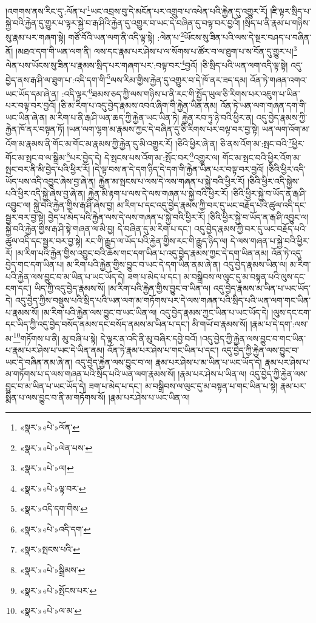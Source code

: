 །འགགས་ནས་རིང་དུ་:ལོན་པ་\footnote{«སྣར་»«པེ་»ལོན་}ཡང་འབྲས་བུ་དེ་མངོན་པར་འགྲུབ་པ་འཕེན་པའི་རྐྱེན་དུ་འགྱུར་རོ། །ཇི་ལྟར་སྲིད་པ་སྐྱེ་བའི་རྐྱེན་དུ་གྱུར་པ་ལྟར་སྐྱེ་བ་རྒ་ཤིའི་རྐྱེན་དུ་འགྱུར་བ་ཡང་དེ་བཞིན་དུ་བལྟ་བར་བྱའོ། །སྲིད་པ་ནི་རྣམ་པ་གཉིས་སུ་རྣམ་པར་གཞག་སྟེ། གཙོ་བོའི་ཡན་ལག་ནི་འདི་ལྟ་སྟེ། :ལེན་པ་\footnote{«སྣར་»«པེ་»ལེན་པས་}ཡོངས་སུ་ཟིན་པའི་ལས་དེ་སྔར་བཤད་པ་བཞིན་ནོ། །མཐའ་དག་གི་ཡན་ལག་ནི། ལས་དང་རྣམ་པར་ཤེས་པ་ལ་སོགས་པ་ཚོར་བ་ལ་ཐུག་པ་ས་བོན་དུ་གྱུར་པ།\footnote{«སྣར་»«པེ་»ལ།} ལེན་པས་ཡོངས་སུ་ཟིན་པ་རྣམས་སྲིད་པར་གཞག་པར་:བལྟ་བར་\footnote{«སྣར་»«པེ་»ལྟ་བར་}བྱའོ། །ཅི་སྲིད་པའི་ཡན་ལག་འདི་ལྟ་སྟེ། འདུ་བྱེད་ནས་རྒ་ཤི་ལ་ཐུག་པ་:འདི་དག་གི་\footnote{«སྣར་»འདི་དག་གིས་}ལས་རིམ་གྱིས་རྐྱེན་དུ་འགྱུར་བ་དེ་ཁོ་ནར་ཟད་དམ། འོན་ཏེ་གཞན་འགའ་ཡང་ཡོད་དམ་ཞེ་ན། :འདི་ལྟར་\footnote{«སྣར་»«པེ་»འདི་དག་}ཐམས་ཅད་ཀྱི་ལས་གཉིས་པ་ནི་རང་གི་སྤྱོད་ཡུལ་ཅི་རིགས་པར་འཇུག་པ་ཡིན་པར་བལྟ་བར་བྱའོ། །ཅི་མ་རིག་པ་འདུ་བྱེད་རྣམས་འབའ་ཞིག་གི་རྐྱེན་ཡིན་ནམ། འོན་ཏེ་ཡན་ལག་གཞན་དག་གི་ཡང་ཡིན་ཞེ་ན། མ་རིག་པ་ནི་རྒ་ཤི་ཡན་ཆད་ཀྱི་རྐྱེན་ཡང་ཡིན་ཏེ། རྐྱེན་རབ་ཏུ་ཉེ་བའི་ཕྱིར་ན། འདུ་བྱེད་རྣམས་ཀྱི་རྐྱེན་ཁོ་ནར་བསྟན་ཏོ། །ཡན་ལག་ལྷག་མ་རྣམས་ཀྱང་དེ་བཞིན་དུ་ཅི་རིགས་པར་བལྟ་བར་བྱ་སྟེ། ཡན་ལག་འོག་མ་འོག་མ་རྣམས་ནི་གོང་མ་གོང་མ་རྣམས་ཀྱི་རྐྱེན་དུ་མི་འགྱུར་རོ། །ཅིའི་ཕྱིར་ཞེ་ན། ཅི་ནས་འོག་མ་:སྤང་བའི་\footnote{«སྣར་»སྤངས་པའི་}ཕྱིར་གོང་མ་སྤང་བ་ལ་སྒྲིམ་\footnote{«སྣར་»«པེ་»སྒྲིམས་}པར་བྱེད་དེ། དེ་སྤངས་པས་འོག་མ་:སྤོང་བར་\footnote{«སྣར་»«པེ་»སྤོངས་པར་}འགྱུར་ལ། གོང་མ་སྤང་བའི་ཕྱིར་འོག་མ་སྤང་བར་ནི་མི་བྱེད་པའི་ཕྱིར་རོ། །དེ་ལྟ་བས་ན་དེ་དག་ཉིད་དེ་དག་གི་རྐྱེན་ཡིན་པར་བལྟ་བར་བྱའོ། །ཅིའི་ཕྱིར་འདི་ཡོད་པས་འདི་འབྱུང་ཞེས་བྱ་ཞེ་ན། རྐྱེན་མ་སྤངས་པ་ལས་དེ་ལས་གཞན་པ་སྐྱེ་བའི་ཕྱིར་རོ། །ཅིའི་ཕྱིར་འདི་སྐྱེས་པའི་ཕྱིར་འདི་སྐྱེ་ཞེས་བྱ་ཞེ་ན། རྐྱེན་མི་རྟག་པ་ལས་དེ་ལས་གཞན་པ་སྐྱེ་བའི་ཕྱིར་རོ། །ཅིའི་ཕྱིར་སྐྱེ་བ་ཡོད་ན་རྒ་ཤི་འབྱུང་ལ། སྐྱེ་བའི་རྐྱེན་གྱིས་རྒ་ཤི་ཞེས་བྱ། མ་རིག་པ་དང་འདུ་བྱེད་རྣམས་ཀྱི་བར་དུ་ཡང་བརྗོད་པའི་ཚུལ་འདི་དང་སྦྱར་བར་བྱ་སྟེ། བྱེད་པ་མེད་པའི་རྐྱེན་ལས་དེ་ལས་གཞན་པ་སྐྱེ་བའི་ཕྱིར་རོ། །ཅིའི་ཕྱིར་སྐྱེ་བ་ཡོད་ན་རྒ་ཤི་འབྱུང་ལ། སྐྱེ་བའི་རྐྱེན་གྱིས་རྒ་ཤི་སྟེ་གཞན་ལ་མི་བྱ། དེ་བཞིན་དུ་མ་རིག་པ་དང་། འདུ་བྱེད་རྣམས་ཀྱི་བར་དུ་ཡང་བརྗོད་པའི་ཚུལ་འདི་དང་སྦྱར་བར་བྱ་སྟེ། རང་གི་རྒྱུད་ལ་ཡོད་པའི་རྐྱེན་གྱིས་རང་གི་རྒྱུད་ཉིད་ལ། དེ་ལས་གཞན་པ་སྐྱེ་བའི་ཕྱིར་རོ། །མ་རིག་པའི་རྐྱེན་གྱིས་འབྱུང་བའི་ཆོས་གང་དག་ཡིན་པ་འདུ་བྱེད་རྣམས་ཀྱང་དེ་དག་ཡིན་ནམ། འོན་ཏེ་འདུ་བྱེད་གང་དག་ཡིན་པ། མ་རིག་པའི་རྐྱེན་གྱིས་བྱུང་བ་ཡང་དེ་དག་ཡིན་ནམ་ཞེ་ན། འདུ་བྱེད་རྣམས་ཡིན་ལ། མ་རིག་པའི་རྐྱེན་ལས་བྱུང་བ་མ་ཡིན་པ་ཡང་ཡོད་དེ། ཟག་པ་མེད་པ་དང་། མ་བསྒྲིབས་ལ་ལུང་དུ་མ་བསྟན་པའི་ལུས་དང་ངག་དང་། ཡིད་ཀྱི་འདུ་བྱེད་རྣམས་སོ། །མ་རིག་པའི་རྐྱེན་གྱིས་བྱུང་བ་ཡིན་ལ། འདུ་བྱེད་རྣམས་མ་ཡིན་པ་ཡང་ཡོད་དེ། འདུ་བྱེད་ཀྱིས་བསྡུས་པའི་སྲིད་པའི་ཡན་ལག་མ་གཏོགས་པར་དེ་ལས་གཞན་པའི་སྲིད་པའི་ཡན་ལག་གང་ཡིན་པ་རྣམས་སོ། །མ་རིག་པའི་རྐྱེན་ལས་བྱུང་བ་ཡང་ཡིན་ལ། འདུ་བྱེད་རྣམས་ཀྱང་ཡིན་པ་ཡང་ཡོད་དེ། །ལུས་དང་ངག་དང་ཡིད་ཀྱི་འདུ་བྱེད་བསོད་ནམས་དང་བསོད་ནམས་མ་ཡིན་པ་དང་། མི་གཡོ་བ་རྣམས་སོ། །རྣམ་པ་དེ་དག་:ལས་མ་\footnote{«སྣར་»«པེ་»ལ་མ་}གཏོགས་པ་ནི། མུ་བཞི་པ་སྟེ། དེ་ལྟར་ན་འདི་ནི་མུ་བཞིར་དབྱེ་བའོ། །འདུ་བྱེད་ཀྱི་རྐྱེན་ལས་བྱུང་བ་གང་ཡིན་པ་རྣམ་པར་ཤེས་པ་ཡང་དེ་ཡིན་ནམ། འོན་ཏེ་རྣམ་པར་ཤེས་པ་གང་ཡིན་པ་དང་། འདུ་བྱེད་ཀྱི་རྐྱེན་ལས་བྱུང་བ་ཡང་དེ་བཞིན་ནམ་ཞེ་ན། འདུ་བྱེད་རྐྱེན་ལས་བྱུང་བ་ལ། རྣམ་པར་ཤེས་པ་མ་ཡིན་པ་ཡང་ཡོད་དེ། རྣམ་པར་ཤེས་པ་མ་གཏོགས་པ་ད་ལས་གཞན་པའི་སྲིད་པའི་ཡན་ལག་རྣམས་སོ། །རྣམ་པར་ཤེས་པ་ཡིན་ལ། འདུ་བྱེད་ཀྱི་རྐྱེན་ལས་བྱུང་བ་མ་ཡིན་པ་ཡང་ཡོད་དེ། ཟག་པ་མེད་པ་དང་། མ་བསྒྲིབས་ལ་ལུང་དུ་མ་བསྟན་པ་གང་ཡིན་པ་སྟེ། རྣམ་པར་སྨིན་པ་ལས་བྱུང་བ་ནི་མ་གཏོགས་སོ། །རྣམ་པར་ཤེས་པ་ཡང་ཡིན་ལ། 